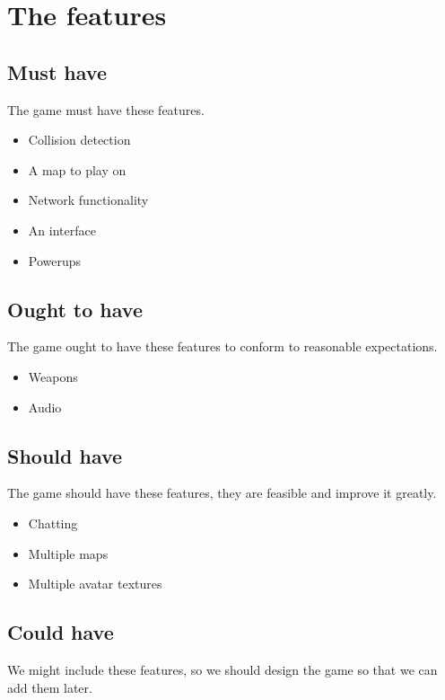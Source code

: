 \documentclass[a4paper,twoside,11pt]{report}
\begin{document}
\chapter{The features}

\section{Must have} %
\label{sec:must_have}
The game must have these features.

 \begin{itemize}
  \item Collision detection
  \item A map to play on
  \item Network functionality
  \item An interface
  \item Powerups
 \end{itemize}

\section{Ought to have} %
\label{sec:ought_to_have}
The game ought to have these features to conform to reasonable expectations.

\begin{itemize}
  \item Weapons
  \item Audio
\end{itemize}

\section{Should have} %
\label{sec:should_have}
The game should have these features, they are feasible and improve it greatly.

\begin{itemize}
  \item Chatting
  \item Multiple maps
  \item Multiple avatar textures
\end{itemize}

\section{Could have} %
\label{sec:could_have}
We might include these features, so we should design the game so that we can add them later.
\end{document}
